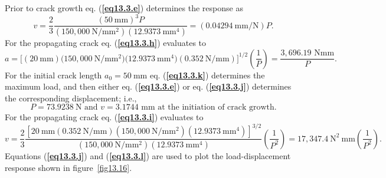 \documentclass{AeroStructure-ERJohnson}
\begin{document}
\begin{example*}
Prior to crack growth eq. (\textbf{\ref{eq13.3.e}}) determines the response as
\begin{equation}
v=\frac{2}{3} \frac{(50 \mathrm{~mm})^{3} P}{\left(150,000 \mathrm{~N} / \mathrm{mm}^{2}\right)\left(12.9373 \mathrm{~mm}^{4}\right)}=(0.04294 \mathrm{~mm} / \mathrm{N}) P. \label{eq13.3.j}\tag{j}
\end{equation}
For the propagating crack eq. (\textbf{\ref{eq13.3.h}}) evaluates to
\begin{equation}
a=\big[(20 \mathrm{~mm})\big(150{,}000 \mathrm{~N} / \mathrm{mm}^{2}\big)\big(12.9373 \mathrm{~mm}^{4}\big)(0.352 \mathrm{~N} / \mathrm{mm})\big]^{1/2}\left(\frac{1}{P}\right)=\frac{3{,}696.19 \textrm{ Nmm}}{P}. \label{eq13.3.k}\tag{k}
\end{equation}
For the initial crack length $a_{0}=50 \mathrm{~mm}$ eq. (\textbf{\ref{eq13.3.k}}) determines the maximum load, and then either eq. (\textbf{\ref{eq13.3.e}}) or eq. (\textbf{\ref{eq13.3.j}}) determines the corresponding displacement; i.e.,
\begin{equation*}
P=73.9238 \mathrm{~N} \textrm{ and } v=3.1744 \textrm{ mm at the initiation of crack growth.}
\end{equation*}
For the propagating crack eq. (\textbf{\ref{eq13.3.i}}) evaluates to
\begin{equation}
v=\frac{2}{3} \frac{[20 \mathrm{~mm}(0.352 \mathrm{~N} / \mathrm{mm})\left(150,000 \mathrm{~N} / \mathrm{mm}^{2}\right)\left(12.9373 \mathrm{~mm}^{4}\right)]^{3 / 2}}{\left(150,000 \mathrm{~N} / \mathrm{mm}^{2}\right)\left(12.9373 \mathrm{~mm}^{4}\right)}\left(\frac{1}{P^{2}}\right)=17,347.4 \mathrm{~N}^{2} \mathrm{~mm}\left(\frac{1}{P^{2}}\right). \label{eq13.3.l}\tag{l}
\end{equation}
Equations (\textbf{\ref{eq13.3.j}}) and (\textbf{\ref{eq13.3.l}}) are used to plot the load-displacement response shown in figure~\ref{fig13.16}.



\end{example*}
\end{document}
